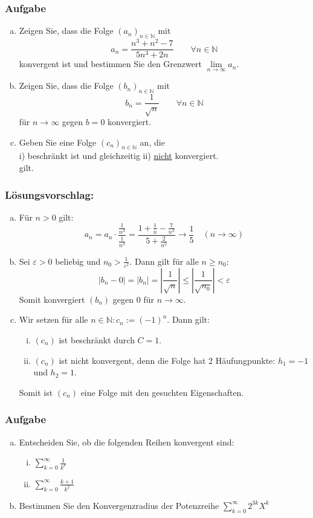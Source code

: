 \documentclass[a4paper,11pt]{scrartcl}
\newcounter{auf}
\newcommand{\Aufgabe}%
        {\addtocounter{auf}{1} \subsubsection*{\rmfamily  Aufgabe \theauf \hspace{1em}} }
\newcommand{\N}{\mathbb{N}}
\begin{document}
\Aufgabe

\begin{enumerate}[a)]

\item Zeigen Sie, dass die Folge $(a_n)_{n \in \N}$ mit 
$$
a_n=\frac{n^3+n^2-7}{5n^3+2n} \qquad \forall n \in \N
$$
konvergent ist und bestimmen Sie den Grenzwert $\lim \limits_{n\to \infty} a_n$.
\item Zeigen Sie, dass die Folge $(b_n)_{n \in \N}$ mit 
$$
b_n=\frac{1}{\sqrt{n}} \qquad \forall n \in \N
$$ 
für $n \to \infty$ gegen $b=0$ konvergiert.
\item Geben Sie eine Folge $(c_n)_{n \in \N}$ an, die \vspace{3mm}\\
\hspace*{5mm} i) beschränkt ist \qquad und gleichzeitig \qquad ii) \underline{nicht} konvergiert. \vspace{3mm}\\
gilt.
\end{enumerate}


\subsubsection*{Lösungsvorschlag:}
\begin{enumerate}[a)]
\item Für $n>0$ gilt: 
$$
a_n=a_n\cdot \frac{\frac{1}{n^3}}{\frac{1}{n^3}}=\frac{1+\frac{1}{n}-\frac{7}{n^3}}{5+\frac{2}{n^2}} \to \frac{1}{5} \quad (n \to \infty)
$$
\item Sei $\varepsilon>0$ beliebig und $n_0 > \frac{1}{\varepsilon^2}$. Dann gilt für alle $n\ge n_0$:
$$
|b_n-0|=|b_n|=|\frac{1}{\sqrt{n}}|\le |\frac{1}{\sqrt{n_0}}|< \varepsilon
$$
Somit konvergiert $(b_n)$ gegen $0$ für $n \to \infty$.
\item Wir setzen für alle $n \in \N: c_n:=(-1)^n$. Dann gilt:
	\begin{enumerate}[i)]
	\item $(c_n)$ ist beschränkt durch $C=1$.
	\item $(c_n)$ ist nicht konvergent, denn die Folge hat 2 Häufungpunkte: $h_1=-1$ und $h_2=1$.
	\end{enumerate}
Somit ist $(c_n)$ eine Folge mit den gesuchten Eigenschaften.
\end{enumerate}


\newpage
\Aufgabe
\begin{enumerate}[a)]
\item Entscheiden Sie, ob die folgenden Reihen konvergent sind:
	\begin{enumerate}[i)]
	\item $\sum \limits_{k=0}^\infty \frac{1}{k^k}$
	\item $\sum \limits_{k=0}^\infty \frac{k+1}{k^2}$
	\end{enumerate}
\item Bestimmen Sie den Konvergenzradius der Potenzreihe $\sum \limits_{k=0}^\infty 2^{3k} X^k$
\end{enumerate}
\end{document}
